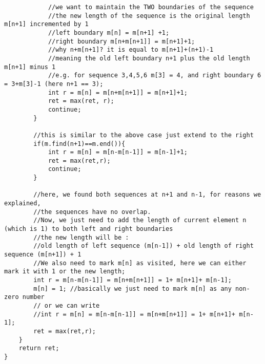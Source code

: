 \begin{description}
\begin{lstlisting}
            //we want to maintain the TWO boundaries of the sequence
            //the new length of the sequence is the original length m[n+1] incremented by 1
            //left boundary m[n] = m[n+1] +1;
            //right boundary m[n+m[n+1]] = m[n+1]+1;
            //why n+m[n+1]? it is equal to m[n+1]+(n+1)-1 
            //meaning the old left boundary n+1 plus the old length m[n+1] minus 1
            //e.g. for sequence 3,4,5,6 m[3] = 4, and right boundary 6 = 3+m[3]-1 (here n+1 == 3);
            int r = m[n] = m[n+m[n+1]] = m[n+1]+1;
            ret = max(ret, r);
            continue;
        }

        //this is similar to the above case just extend to the right
        if(m.find(n+1)==m.end()){
            int r = m[n] = m[n-m[n-1]] = m[n-1]+1;
            ret = max(ret,r);
            continue;
        }

        //here, we found both sequences at n+1 and n-1, for reasons we explained,
        //the sequences have no overlap.
        //Now, we just need to add the length of current element n (which is 1) to both left and right boundaries
        //the new length will be :  
        //old length of left sequence (m[n-1]) + old length of right sequence (m[n+1]) + 1
        //We also need to mark m[n] as visited, here we can either mark it with 1 or the new length;
        int r = m[n-m[n-1]] = m[n+m[n+1]] = 1+ m[n+1]+ m[n-1];
        m[n] = 1; //basically we just need to mark m[n] as any non-zero number
        // or we can write
        //int r = m[n] = m[n-m[n-1]] = m[n+m[n+1]] = 1+ m[n+1]+ m[n-1];
        ret = max(ret,r);
    }
    return ret;
}
		\end{lstlisting}

\end{description}

